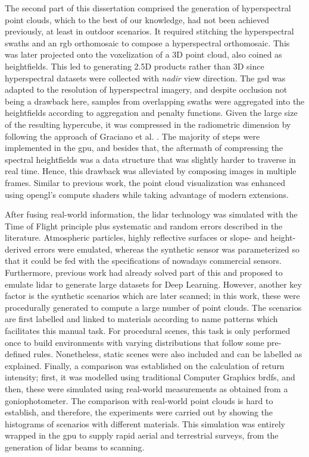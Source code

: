 The second part of this dissertation comprised the generation of hyperspectral point clouds, which to the best of our knowledge, had not been achieved previously, at least in outdoor scenarios. It required stitching the hyperspectral swaths and an \acrshort{rgb} orthomosaic to compose a hyperspectral orthomosaic. This was later projected onto the voxelization of a 3D point cloud, also coined as heightfields. This led to generating 2.5D products rather than 3D since hyperspectral datasets were collected with \textit{nadir} view direction. The \acrshort{gsd} was adapted to the resolution of hyperspectral imagery, and despite occlusion not being a drawback here, samples from overlapping swaths were aggregated into the heightfields according to aggregation and penalty functions. Given the large size of the resulting hypercube, it was compressed in the radiometric dimension by following the approach of Graciano et al. \cite{graciano_real-time_2018}. The majority of steps were implemented in the \acrshort{gpu}, and besides that, the aftermath of compressing the spectral heightfields was a data structure that was slightly harder to traverse in real time. Hence, this drawback was alleviated by composing images in multiple frames. Similar to previous work, the point cloud visualization was enhanced using \acrshort{opengl}'s compute shaders while taking advantage of modern extensions.

After fusing real-world information, the \acrshort{lidar} technology was simulated with the Time of Flight principle plus systematic and random errors described in the literature. Atmospheric particles, highly reflective surfaces or slope- and height-derived errors were emulated, whereas the synthetic sensor was parameterized so that it could be fed with the specifications of nowadays commercial sensors. Furthermore, previous work had already solved part of this and proposed to emulate \acrshort{lidar} to generate large datasets for Deep Learning. However, another key factor is the synthetic scenarios which are later scanned; in this work, these were procedurally generated to compute a large number of point clouds. The scenarios are first labelled and linked to materials according to name patterns which facilitates this manual task. For procedural scenes, this task is only performed once to build environments with varying distributions that follow some pre-defined rules. Nonetheless, static scenes were also included and can be labelled as explained. Finally, a comparison was established on the calculation of return intensity; first, it was modelled using traditional Computer Graphics \acrshort{brdf}s, and then, these were simulated using real-world measurements as obtained from a goniophotometer. The comparison with real-world point clouds is hard to establish, and therefore, the experiments were carried out by showing the histograms of scenarios with different materials. This simulation was entirely wrapped in the \acrshort{gpu} to supply rapid aerial and terrestrial surveys, from the generation of \acrshort{lidar} beams to scanning. 


